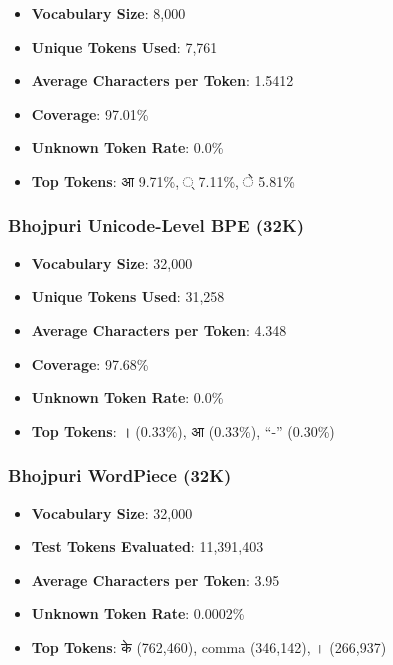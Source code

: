\documentclass[11pt,a4paper]{article}
\begin{document}
\begin{itemize}
    \item \textbf{Vocabulary Size}: 8,000
    \item \textbf{Unique Tokens Used}: 7,761
    \item \textbf{Average Characters per Token}: 1.5412
    \item \textbf{Coverage}: 97.01\%
    \item \textbf{Unknown Token Rate}: 0.0\%
    \item \textbf{Top Tokens}: {\devanagariFont आ} 9.71\%, {\devanagariFont ्} 7.11\%, {\devanagariFont े} 5.81\%
\end{itemize}

\subsubsection{Bhojpuri Unicode-Level BPE (32K)}

\begin{itemize}
    \item \textbf{Vocabulary Size}: 32,000
    \item \textbf{Unique Tokens Used}: 31,258
    \item \textbf{Average Characters per Token}: 4.348
    \item \textbf{Coverage}: 97.68\%
    \item \textbf{Unknown Token Rate}: 0.0\%
    \item \textbf{Top Tokens}: {\devanagariFont ।} (0.33\%), {\devanagariFont आ} (0.33\%), ``-'' (0.30\%)
\end{itemize}

\subsubsection{Bhojpuri WordPiece (32K)}

\begin{itemize}
    \item \textbf{Vocabulary Size}: 32,000
    \item \textbf{Test Tokens Evaluated}: 11,391,403
    \item \textbf{Average Characters per Token}: 3.95
    \item \textbf{Unknown Token Rate}: 0.0002\%
    \item \textbf{Top Tokens}: {\devanagariFont के} (762,460), comma (346,142), {\devanagariFont ।} (266,937)
\end{itemize}
\end{document}
